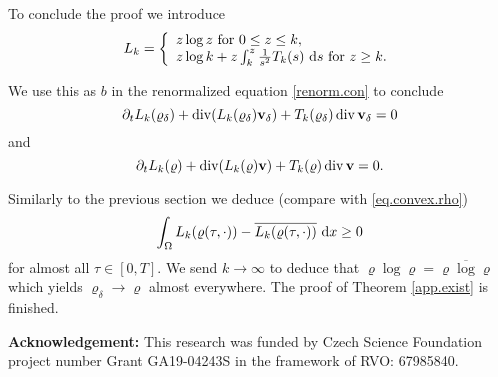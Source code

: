 \documentclass{article}
\DeclareMathOperator{\diver}{div}
\newcommand{\bv}{{\bf v}}
\newcommand{\vv}{\bv}
\newcommand{\pat}{\partial_t}
\numberwithin{equation}{section}
\begin{document}
To conclude the proof we introduce
$$
L_k =\left\{
\begin{array}{l}
z\log z\mbox{ for } 0\leq z\leq k,\\
z\log k + z\int_k^z\frac1{s^2}T_k(s)\ {\rm d}s \mbox{ for }z\geq k.
\end{array}
\right.
$$

We use this as $b$ in the renormalized equation \eqref{renorm.con} to conclude
$$
\pat L_k(\varrho_\delta) + \diver(L_k(\varrho_\delta)\vv_\delta) + T_k(\varrho_\delta)\diver\vv_\delta = 0
$$
and
$$
\pat L_k(\varrho) + \diver(L_k(\varrho)\vv) + T_k(\varrho)\diver\vv = 0.
$$

Similarly to the previous section we deduce (compare with \eqref{eq.convex.rho})
$$
\int_\Omega L_k(\varrho(\tau,\cdot)) - \overline{L_k(\varrho(\tau,\cdot))}\ {\rm d}x \geq 0
$$
for almost all $\tau\in [0,T]$. We send $k\to\infty$ to deduce that $\varrho\log\varrho = \overline{\varrho\log\varrho}$ which yields $\varrho_\delta\to\varrho$ almost everywhere. The proof of Theorem \ref{app.exist} is finished.
\bigskip

{\bf Acknowledgement:} This research was funded by Czech Science Foundation project number Grant GA19-04243S  in the framework of RVO: 67985840.




\end{document}
